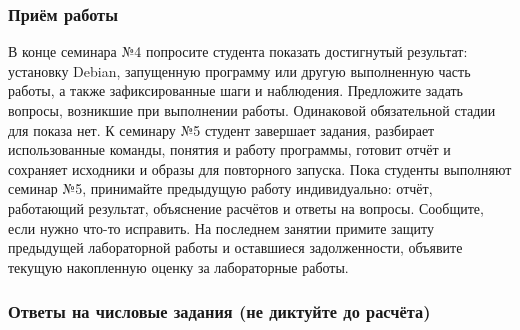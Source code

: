 \hypertarget{ux43fux440ux438ux451ux43c-ux440ux430ux431ux43eux442ux44b}{%
\subsubsection{Приём
работы}\label{ux43fux440ux438ux451ux43c-ux440ux430ux431ux43eux442ux44b}}

В конце семинара №4 попросите студента показать достигнутый результат:
установку Debian, запущенную программу или другую выполненную часть
работы, а также зафиксированные шаги и наблюдения. Предложите задать
вопросы, возникшие при выполнении работы. Одинаковой обязательной стадии
для показа нет. К семинару №5 студент завершает задания, разбирает
использованные команды, понятия и работу программы, готовит отчёт и
сохраняет исходники и образы для повторного запуска. Пока студенты
выполняют семинар №5, принимайте
предыдущую работу индивидуально: отчёт, работающий результат, объяснение
расчётов и ответы на вопросы. Сообщите, если нужно что-то исправить.
На последнем занятии примите защиту предыдущей лабораторной работы и
оставшиеся задолженности, объявите текущую накопленную оценку за
лабораторные работы.

\hypertarget{ux43eux442ux432ux435ux442ux44b-ux43dux430-ux447ux438ux441ux43bux43eux432ux44bux435-ux437ux430ux434ux430ux43dux438ux44f-ux43dux435-ux434ux438ux43aux442ux443ux439ux442ux435-ux434ux43e-ux440ux430ux441ux447ux451ux442ux430}{%
\subsubsection{Ответы на числовые задания (не диктуйте до
расчёта)}\label{ux43eux442ux432ux435ux442ux44b-ux43dux430-ux447ux438ux441ux43bux43eux432ux44bux435-ux437ux430ux434ux430ux43dux438ux44f-ux43dux435-ux434ux438ux43aux442ux443ux439ux442ux435-ux434ux43e-ux440ux430ux441ux447ux451ux442ux430}}

